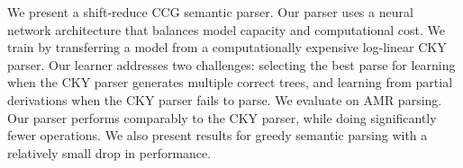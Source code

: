 We present a shift-reduce CCG semantic parser. Our parser uses a neural network architecture that balances model capacity and computational cost. We train by transferring a model from a computationally expensive log-linear CKY parser. Our learner addresses two challenges: selecting the best parse for learning when the CKY parser generates multiple correct trees, and learning from partial derivations when the CKY parser fails to parse. We evaluate on AMR parsing. Our parser performs comparably to the CKY parser, while doing significantly fewer operations. We also present results for greedy semantic parsing with a relatively small drop in performance.
